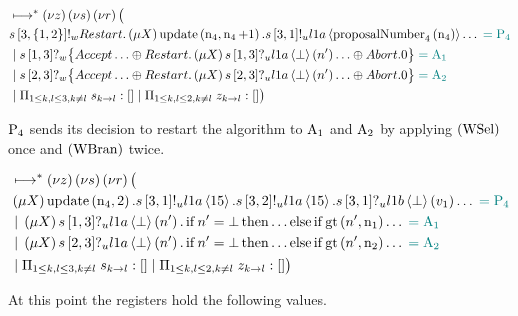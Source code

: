 \begin{align*}
&\longmapsto^* \left(\nu z\right)\left(\nu s\right)\left(\nu r\right) \big (\\
&
    s\left[3, \left\{1,2\right\}\right]!_w \mathnormal{Restart}.
        \left(\mu X\right)
        \operatorname{update} \left(\operatorname{n}_4, \operatorname{n}_4 + 1\right).
        s\left[3, 1\right]!_u l1a \left\langle \operatorname{proposalNumber}_4\left( \operatorname{n}_4\right) \right\rangle\ldots
    \;\textcolor{teal}{= \operatorname{P_{4}}}\\
&\; | \;
    s\left[1, 3\right]?_w \big\{
        \mathnormal{Accept} \ldots
        \oplus
            \mathnormal{Restart} .
            \left(\mu X\right) s\left[1, 3\right]?_u l1a \left\langle \bot \right\rangle \left(n'\right)\ldots
        \oplus \mathnormal{Abort} . 0
    \big\} \;\textcolor{teal}{= \operatorname{A_{1}}}\\
&\; | \;
    s\left[2, 3\right]?_w \big\{
        \mathnormal{Accept} \ldots
        \oplus
            \mathnormal{Restart} .
            \left(\mu X\right) s\left[2, 3\right]?_u l1a \left\langle \bot \right\rangle \left(n'\right)\ldots
        \oplus \mathnormal{Abort} . 0
    \big\} \;\textcolor{teal}{= \operatorname{A_{2}}}\\
&\; | \; \Pi_{1 \le k,l \le 3, k \neq l}\; s_{k\to l}:[]
\; | \; \Pi_{1 \le k,l \le 2, k \neq l}\; z_{k\to l}:[]
\big )
\end{align*}

$\operatorname{P_{4}}$ sends its decision to restart the algorithm to $\operatorname{A_{1}}$ and $\operatorname{A_{2}}$ by applying $\left(\operatorname{WSel}\right)$ once and $\left(\operatorname{WBran}\right)$ twice.

\begin{align*}
&\mapstostar \NuChannels \big (\\
&
    \Mu{\RecursionVariable}
    \update{\NumberRegister_4}{2}.
    \SendUnreliableP{\ChannelS}{3}{1}{\LOneA}{15}.
    \SendUnreliableP{\ChannelS}{3}{2}{\LOneA}{15}.
    \ReceiveUnreliableP{\ChannelS}{3}{1}{\LOneB}{\bot}{v_1}\ldots
    \comment{= \Proposer{4}}\\
&\Or
    \Mu{\RecursionVariable}
    \ReceiveUnreliableP{\ChannelS}{1}{3}{\LOneA}{\bot}{n'}.
    \If{n' = \bot}
    \Then{\ldots}
    \Else{
        \If{\greaterThan{n'}{\NumberRegister_1}}\ldots
    }
    \comment{= \Acceptor{1}}\\
&\Or
    \Mu{\RecursionVariable}
    \ReceiveUnreliableP{\ChannelS}{2}{3}{\LOneA}{\bot}{n'}.
    \If{n' = \bot}
    \Then{\ldots}
    \Else{
        \If{\greaterThan{n'}{\NumberRegister_2}}\ldots
    }
    \comment{= \Acceptor{2}}\\
&\Or \InnerSessionQueues{\ChannelS}
\Or \OuterSessionQueues
\big )
\end{align*}

At this point the registers hold the following values.

